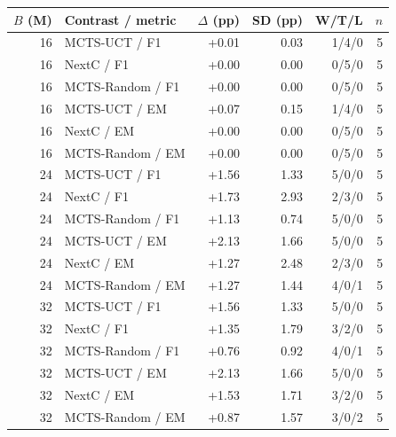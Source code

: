 \begin{tabular}{rlrrrr}
\toprule
$B$ (M) & Contrast / metric & $\Delta$ (pp) & SD (pp) & W/T/L & $n$\\
\midrule
16 & MCTS-UCT / F1 & +0.01 & 0.03 & 1/4/0 & 5\\
16 & NextC / F1 & +0.00 & 0.00 & 0/5/0 & 5\\
16 & MCTS-Random / F1 & +0.00 & 0.00 & 0/5/0 & 5\\
16 & MCTS-UCT / EM & +0.07 & 0.15 & 1/4/0 & 5\\
16 & NextC / EM & +0.00 & 0.00 & 0/5/0 & 5\\
16 & MCTS-Random / EM & +0.00 & 0.00 & 0/5/0 & 5\\
24 & MCTS-UCT / F1 & +1.56 & 1.33 & 5/0/0 & 5\\
24 & NextC / F1 & +1.73 & 2.93 & 2/3/0 & 5\\
24 & MCTS-Random / F1 & +1.13 & 0.74 & 5/0/0 & 5\\
24 & MCTS-UCT / EM & +2.13 & 1.66 & 5/0/0 & 5\\
24 & NextC / EM & +1.27 & 2.48 & 2/3/0 & 5\\
24 & MCTS-Random / EM & +1.27 & 1.44 & 4/0/1 & 5\\
32 & MCTS-UCT / F1 & +1.56 & 1.33 & 5/0/0 & 5\\
32 & NextC / F1 & +1.35 & 1.79 & 3/2/0 & 5\\
32 & MCTS-Random / F1 & +0.76 & 0.92 & 4/0/1 & 5\\
32 & MCTS-UCT / EM & +2.13 & 1.66 & 5/0/0 & 5\\
32 & NextC / EM & +1.53 & 1.71 & 3/2/0 & 5\\
32 & MCTS-Random / EM & +0.87 & 1.57 & 3/0/2 & 5\\
\bottomrule
\end{tabular}
